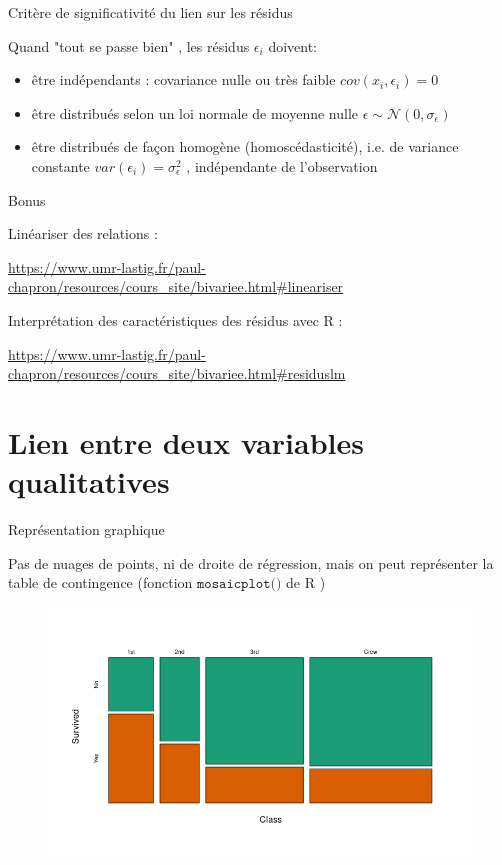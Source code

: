 \documentclass{beamer}
\begin{document}
\begin{frame}[fragile]{Critère de significativité du lien sur les résidus  }

Quand "tout se passe bien" , les \alert{résidus} $\epsilon_i$  doivent:


\begin{itemize}
\item être indépendants  : covariance nulle ou très faible $cov(x_i, \epsilon_i) = 0$
\item être distribués selon un loi normale de moyenne nulle $\epsilon \sim \mathscr{N}(0,\sigma_{\epsilon})$
\item être distribués de façon homogène (homoscédasticité), i.e. de variance constante $var(\epsilon_i)=\sigma_{\epsilon}^2$ , indépendante de l'observation
\end{itemize}

 
\end{frame}



\begin{frame}[fragile]{Bonus }


Linéariser des relations : 

\url{https://www.umr-lastig.fr/paul-chapron/resources/cours_site/bivariee.html#lineariser}


Interprétation des caractéristiques des résidus avec R  : 


\url{https://www.umr-lastig.fr/paul-chapron/resources/cours_site/bivariee.html#residuslm}
\end{frame}


\section{Lien entre deux variables qualitatives}
\begin{frame}{Représentation graphique}
  
  Pas de nuages de points, ni de droite de régression, mais on peut représenter la \alert{table de contingence} (fonction $\texttt{mosaicplot()}$
 de R ) 
 
  
\begin{figure}
  \centering
     \includegraphics[width=.9\linewidth]{img/mosaic.png}
\end{figure}
  
   
\end{frame}
\end{document}
